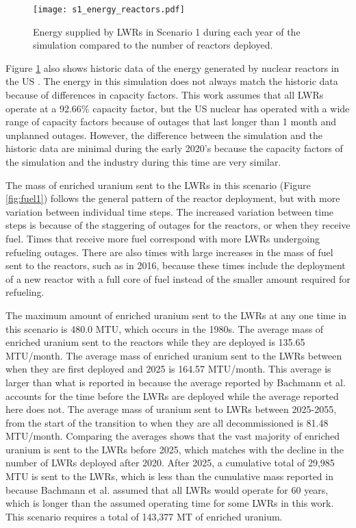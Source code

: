 \begin{figure}[h!]
    \centering
    \texttt{[image: s1\_energy\_reactors.pdf]}
    \caption{Energy supplied by \glspl{LWR} in Scenario 1 during each year of
    the simulation compared to the number of reactors deployed.}
    \label{fig:energy_reactor1}
\end{figure}

Figure \ref{fig:energy_reactor1} also shows historic data of the 
energy generated by nuclear reactors in the US \cite{noauthor_total_2022}.
The energy in this simulation does not always match the historic data 
because of differences in capacity factors. This work assumes that all 
\glspl{LWR} operate at a 92.66\% capacity factor, but the US nuclear 
has operated with a wide range of capacity factors because of outages 
that last longer than 1 month and unplanned outages. However, 
the difference between the simulation and the historic data are minimal 
during the early 2020's because the capacity factors of the simulation 
and the industry during this time are very similar. 

The mass of enriched uranium sent to the \glspl{LWR} in this scenario (Figure 
\ref{fig:fuel1}) follows the general pattern of the reactor deployment, but with 
more variation between individual time steps. The increased variation between 
time steps is because of the staggering of outages for the reactors, or when 
they receive fuel. Times that receive more fuel correspond with more 
\glspl{LWR} undergoing refueling outages. There are also times with large 
increases in the mass of fuel 
sent to the reactors, such as in 2016, because these times include the deployment 
of a new reactor with a full core of fuel instead of the smaller amount 
required for refueling.

The maximum amount of enriched uranium sent to the \glspl{LWR} at any one 
time in this scenario is 480.0 MTU, which occurs in the 1980s. The 
average mass of enriched uranium sent to 
the reactors while they are deployed is 135.65 MTU/month. The average mass of 
enriched uranium sent to the \glspl{LWR} between when they are first deployed 
and 2025 is 164.57 MTU/month. This average is larger than what is reported in 
\cite{bachmann_enrichment_2021} because the average reported by 
Bachmann et al. accounts for the time before the \glspl{LWR} are  
deployed while the average reported here does not. The average mass of 
uranium sent to \glspl{LWR} between 2025-2055, from the start of the transition 
to when they are all decommissioned is 81.48 MTU/month. Comparing the averages 
shows that the vast majority of enriched uranium is sent to the \glspl{LWR} 
before 2025, which matches with the decline in the number of \glspl{LWR} 
deployed after 2020. After 2025, a cumulative total of 29,985 MTU is 
sent to the \glspl{LWR},
which is less than the cumulative mass reported in \cite{bachmann_enrichment_2021}
because Bachmann et al. assumed that all \glspl{LWR} would operate for 60 years, 
which is longer than the assumed operating time for some \glspl{LWR} in 
this work. This scenario requires a total of 143,377 MT of enriched uranium.

